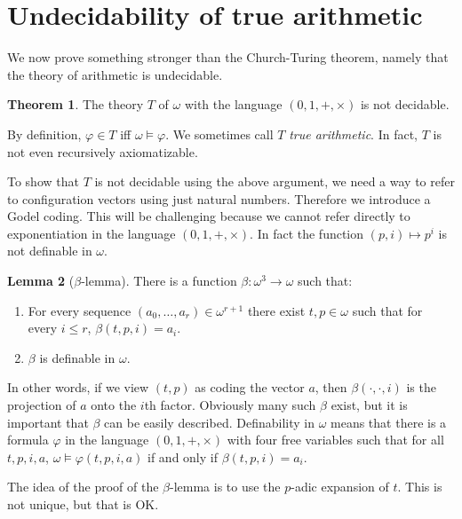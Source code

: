\documentclass[12pt]{report}
\newcommand{\dfn}[1]{\emph{#1}\index{#1}}
\theoremstyle{definition}
\newtheorem{theorem}{Theorem}[chapter]
\newtheorem{lemma}[theorem]{Lemma}
\begin{document}
\section{Undecidability of true arithmetic}
We now prove something stronger than the Church-Turing theorem, namely that the theory of arithmetic is undecidable.
\begin{theorem}
\label{true arithmetic is undecidable}
The theory $T$ of $\omega$ with the language $(0, 1, +, \times)$ is not decidable.
\end{theorem}
By definition, $\varphi \in T$ iff $\omega \models \varphi$. We sometimes call $T$ \dfn{true arithmetic}. In fact, $T$ is not even recursively axiomatizable.

To show that $T$ is not decidable using the above argument, we need a way to refer to configuration vectors using just natural numbers. Therefore we introduce a Godel coding. This will be challenging because we cannot refer directly to exponentiation in the language $(0, 1, +, \times)$. In fact the function $(p, i) \mapsto p^i$ is not definable in $\omega$.
\begin{lemma}[$\beta$-lemma]
There is a function $\beta: \omega^3 \to \omega$ such that:
\begin{enumerate}
\item For every sequence $(a_0, \dots, a_r) \in \omega^{r+1}$ there exist $t, p \in \omega$ such that for every $i \leq r$, $\beta(t, p, i) = a_i$.
\item $\beta$ is definable in $\omega$.
\end{enumerate}
\end{lemma}
In other words, if we view $(t, p)$ as coding the vector $a$, then $\beta(\cdot, \cdot, i)$ is the projection of $a$ onto the $i$th factor. Obviously many such $\beta$ exist, but it is important that $\beta$ can be easily described.
Definability in $\omega$ means that there is a formula $\varphi$ in the language $(0, 1, +, \times)$ with four free variables such that for all $t, p, i, a$, $\omega \models \varphi(t, p, i, a)$ if and only if $\beta(t, p, i) = a_i$.

The idea of the proof of the $\beta$-lemma is to use the $p$-adic expansion of $t$. This is not unique, but that is OK.
\end{document}
